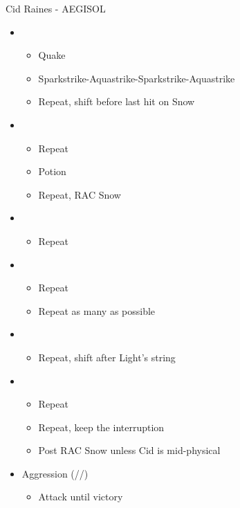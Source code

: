	\begin{battle}[1:22]{Cid Raines - AEGISOL}
	\begin{itemize}
	\renewcommand{\fourth}{[4] Aggression (\com/\com/\rav)}
			\item \first
			      \begin{itemize}
				      \item Quake
				      \item Sparkstrike-Aquastrike-Sparkstrike-Aquastrike
				      \item Repeat, shift before last hit on Snow
			      \end{itemize}
			\item \second
			      \begin{itemize}
				      \item Repeat
				      \item Potion
				      \item Repeat, RAC Snow
			      \end{itemize}
			\item \third
			      \begin{itemize}
				      \item Repeat
			      \end{itemize}
			\item \second
			      \begin{itemize}
				      \item Repeat
				      \item Repeat as many as possible
			      \end{itemize}
			\item \third
			      \begin{itemize}
				      \item Repeat, shift after Light's string
			      \end{itemize}
			\item \second
			      \begin{itemize}
				      \item Repeat
				      \item Repeat, keep the interruption
				      \item Post \stagger RAC Snow unless Cid is mid-physical
			      \end{itemize}
			\item \fourth
			      \begin{itemize}
				      \item Attack until victory
			      \end{itemize}
		\end{itemize}
		\end{battle}
